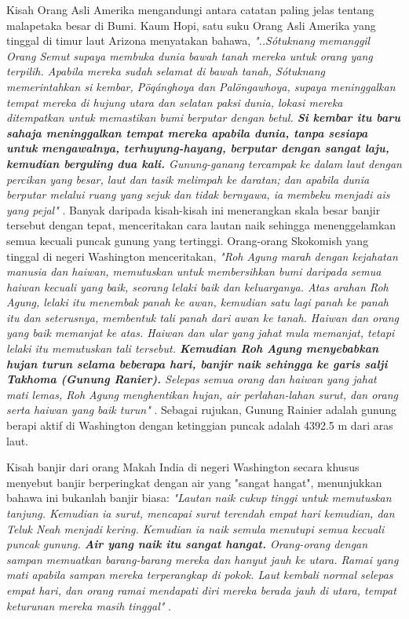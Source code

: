 \documentclass[10pt,twocolumn,letterpaper]{article}
\begin{document}
Kisah Orang Asli Amerika mengandungi antara catatan paling jelas tentang malapetaka besar di Bumi. Kaum Hopi, satu suku Orang Asli Amerika yang tinggal di timur laut Arizona menyatakan bahawa, \textit{"..Sótuknang memanggil Orang Semut supaya membuka dunia bawah tanah mereka untuk orang yang terpilih. Apabila mereka sudah selamat di bawah tanah, Sótuknang memerintahkan si kembar, Pöqánghoya dan Palöngawhoya, supaya meninggalkan tempat mereka di hujung utara dan selatan paksi dunia, lokasi mereka ditempatkan untuk memastikan bumi berputar dengan betul. \textbf{Si kembar itu baru sahaja meninggalkan tempat mereka apabila dunia, tanpa sesiapa untuk mengawalnya, terhuyung-hayang, berputar dengan sangat laju, kemudian berguling dua kali.} Gunung-ganang tercampak ke dalam laut dengan percikan yang besar, laut dan tasik melimpah ke daratan; dan apabila dunia berputar melalui ruang yang sejuk dan tidak bernyawa, ia membeku menjadi ais yang pejal"} \cite{4}.
Banyak daripada kisah-kisah ini menerangkan skala besar banjir tersebut dengan tepat, menceritakan cara lautan naik sehingga menenggelamkan semua kecuali puncak gunung yang tertinggi. Orang-orang Skokomish yang tinggal di negeri Washington menceritakan, \textit{"Roh Agung marah dengan kejahatan manusia dan haiwan, memutuskan untuk membersihkan bumi daripada semua haiwan kecuali yang baik, seorang lelaki baik dan keluarganya. Atas arahan Roh Agung, lelaki itu menembak panah ke awan, kemudian satu lagi panah ke panah itu dan seterusnya, membentuk tali panah dari awan ke tanah. Haiwan dan orang yang baik memanjat ke atas. Haiwan dan ular yang jahat mula memanjat, tetapi lelaki itu memutuskan tali tersebut. \textbf{Kemudian Roh Agung menyebabkan hujan turun selama beberapa hari, banjir naik sehingga ke garis salji Takhoma (Gunung Ranier).} Selepas semua orang dan haiwan yang jahat mati lemas, Roh Agung menghentikan hujan, air perlahan-lahan surut, dan orang serta haiwan yang baik turun"} \cite{3}. Sebagai rujukan, Gunung Rainier adalah gunung berapi aktif di Washington dengan ketinggian puncak adalah 4392.5 m dari aras laut.

Kisah banjir dari orang Makah India di negeri Washington secara khusus menyebut banjir berperingkat dengan air yang "sangat hangat", menunjukkan bahawa ini bukanlah banjir biasa: \textit{"Lautan naik cukup tinggi untuk memutuskan tanjung. Kemudian ia surut, mencapai surut terendah empat hari kemudian, dan Teluk Neah menjadi kering. Kemudian ia naik semula menutupi semua kecuali puncak gunung. \textbf{Air yang naik itu sangat hangat.} Orang-orang dengan sampan memuatkan barang-barang mereka dan hanyut jauh ke utara. Ramai yang mati apabila sampan mereka terperangkap di pokok. Laut kembali normal selepas empat hari, dan orang ramai mendapati diri mereka berada jauh di utara, tempat keturunan mereka masih tinggal"} \cite{3}.
\end{document}
